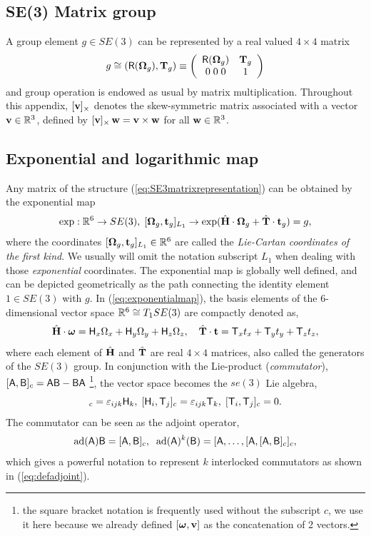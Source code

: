 \documentclass[conference]{IEEEtran}
\newcommand{\real}{\Bbb R}
\newcommand{\bfomega}{\boldsymbol{\omega}}
\newcommand{\bfOmega}{\boldsymbol{\Omega}}
\newcommand{\adj}[1]{\mathrm{ad}({#1})}
\newcommand{\beq}{\begin{equation}}
\newcommand{\eeq}{\end{equation}}
\begin{document}
\begin{appendix}

\section{SE(3) Matrix group}
\label{app:SE3group}
A group element $g\in SE(3)$ can be represented by a real valued $4\times 4$ matrix
\beq
    g \cong ({\sf R}(\bfOmega_g),{\bf T}_g) \equiv \left(
    \begin{array}{cc}
        {\sf R}(\bfOmega_g) & {\bf T}_g \\
        0\; 0\; 0 & 1
    \end{array} \right) \label{eq:SE3matrixrepresentation}
\eeq
and group operation is endowed as usual by matrix multiplication.
Throughout this appendix, $[{\bf v}]_\times$ denotes the skew-symmetric matrix associated
with a vector ${\bf v}\in\real^3$, defined by $[{\bf v}]_\times\,{\bf w} = {\bf v}\times{\bf w}$
for all ${\bf w}\in\real^3$.

\subsection{Exponential and logarithmic map}
\label{app:expmap}
Any matrix of the structure (\ref{eq:SE3matrixrepresentation}) can be obtained
by the exponential map
\beq
    \exp: \real^6 \rightarrow SE(3),\;
    [\bfOmega_g, {\bf t}_g]_{L_1} \rightarrow
    \exp( \hat{\bf H}\cdot\bfOmega_g + \hat{\bf T}\cdot{\bf t}_g ) = g,
    \label{eq:exponentialmap}
\eeq
where the coordinates $[\bfOmega_g,{\bf t}_g]_{L_1} \in \real^6$ are called the
{\em Lie-Cartan coordinates of the first kind}. We usually will omit the notation subscript
$L_1$ when dealing with those {\em exponential} coordinates. The exponential map is globally well defined,
and can be depicted geometrically as the path connecting the identity element $1\in SE(3)$ with
$g$. In (\ref{eq:exponentialmap}), the basis elements
of the 6-dimensional vector space $\real^6\cong T_1SE(3)$ are compactly denoted as,
\beq
    \hat{\bf H}\cdot\bfomega={\sf H}_x\Omega_x+{\sf H}_y\Omega_y+{\sf H}_z\Omega_z,\quad
    \hat{\bf T}\cdot{\bf t} ={\sf T}_x t_x + {\sf T}_y t_y + {\sf T}_z t_z,
    \label{eq:generatingmatrices}
\eeq
where each element of $\hat{\bf H}$ and $\hat{\bf T}$ are real $4\times 4$ matrices,
also called the generators of the $SE(3)$ group. In conjunction with the Lie-product
({\em commutator}), $[{\sf A},{\sf B}]_c = {\sf AB}-{\sf BA}$ \footnote{the square bracket
notation is frequently used without the subscript $c$, we use it here because we already
defined $[{\bfomega},{\bf v}]$ as the concatenation of 2 vectors.},
the vector space becomes the $se(3)$ Lie algebra,
\beq
    [{\sf H}_i,{\sf H}_j]_c = \varepsilon_{ijk}{\sf H}_k,\;
    [{\sf H}_i,{\sf T}_j]_c = \varepsilon_{ijk}{\sf T}_k,\;
    [{\sf T}_i, {\sf T}_j]_c = 0. \label{eq:commutatortable}
\eeq
The commutator can be seen as the adjoint operator,
\beq
    \adj{\sf A} {\sf B} = [{\sf A},{\sf B}]_c, \;\;
    \adj{\sf A}^k({\sf B}) = [{\sf A},\ldots,[{\sf A},[{\sf A},{\sf B}]_c]_c,
    \label{eq:defadjoint}
\eeq
which gives a powerful notation to represent $k$ interlocked commutators
as shown in (\ref{eq:defadjoint}).


\end{appendix}
\end{document}
